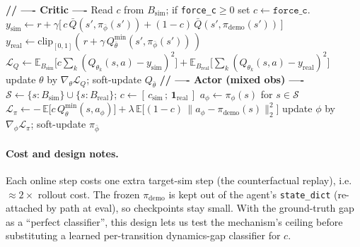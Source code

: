 \documentclass[11pt]{article}
\newcommand{\pphi}{\pi_{\phi}}
\newcommand{\pdemo}{\pi_{\mathrm{demo}}}
\newcommand{\Qth}{Q_{\theta}}
\newcommand{\Qtt}{Q_{\bar{\theta}}}
\newcommand{\pbar}{\pi_{\bar{\phi}}}
\newcommand{\clip}[1]{\mathrm{clip}_{[0,1]}\!\left(#1\right)}
\begin{document}
\begin{algorithm}[h]
\caption{\textsc{GatedUpdate}($B_{\mathrm{sim}}, B_{\mathrm{real}},
\text{update\_actor}$)}
\label{alg:update}
\begin{algorithmic}[1]
\State \textbf{// ---- Critic ----}
\State Read $c$ from $B_{\mathrm{sim}}$;\; if \texttt{force\_c}$\ge0$ set
       $c\!\gets\!\texttt{force\_c}$.
\State $y_{\mathrm{sim}} \gets r + \gamma\big[\,c\,\bar{Q}(s',\pbar(s'))
       + (1-c)\,\bar{Q}(s',\pdemo(s'))\,\big]$
\State $y_{\mathrm{real}} \gets \clip{\, r + \gamma\,\Qtt^{\min}(s',\pbar(s'))\,}$
\State $\mathcal{L}_Q \gets
       \mathbb{E}_{B_{\mathrm{sim}}}\!\big[c\textstyle\sum_k(Q_{\theta_k}(s,a)-
       y_{\mathrm{sim}})^2\big]
       + \mathbb{E}_{B_{\mathrm{real}}}\!\big[\textstyle\sum_k(Q_{\theta_k}(s,a)-
       y_{\mathrm{real}})^2\big]$
\State update $\theta$ by $\nabla_\theta\mathcal{L}_Q$;\; soft-update $\Qtt$
  \State \textbf{// ---- Actor (mixed obs) ----}
  \State $\mathcal{S}\gets \{s : B_{\mathrm{sim}}\}\cup\{s : B_{\mathrm{real}}\}$;\;
         $c \gets [\,c_{\mathrm{sim}}\,;\, \bm{1}_{\mathrm{real}}\,]$
  \State $a_\phi \gets \pphi(s)$ for $s\in\mathcal{S}$
  \State $\mathcal{L}_\pi \gets
         -\,\mathbb{E}\big[c\,\Qth^{\min}(s,a_\phi)\big]
         + \lambda\,\mathbb{E}\big[(1-c)\,\lVert a_\phi-\pdemo(s)\rVert_2^2\big]$
  \State update $\phi$ by $\nabla_\phi\mathcal{L}_\pi$;\; soft-update $\pbar$
\EndIf
\end{algorithmic}
\end{algorithm}

\paragraph{Cost and design notes.}
Each online step costs one extra target-sim step (the counterfactual replay),
i.e.\ $\approx\!2\times$ rollout cost. The frozen $\pdemo$ is kept out of the
agent's \texttt{state\_dict} (re-attached by path at eval), so checkpoints stay
small. With the ground-truth gap as a ``perfect classifier'', this design lets
us test the mechanism's ceiling before substituting a learned per-transition
dynamics-gap classifier for $c$.
\end{document}
